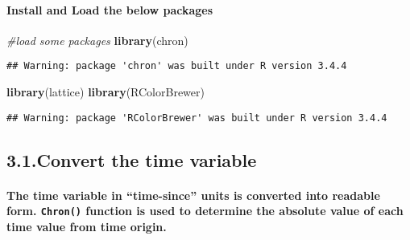 \documentclass[]{article}
\newenvironment{Shaded}{\begin{snugshade}}{\end{snugshade}}
\newcommand{\KeywordTok}[1]{\textcolor[rgb]{0.13,0.29,0.53}{\textbf{#1}}}
\newcommand{\CommentTok}[1]{\textcolor[rgb]{0.56,0.35,0.01}{\textit{#1}}}
\newcommand{\NormalTok}[1]{#1}
\let\oldparagraph\paragraph
\renewcommand{\paragraph}[1]{\oldparagraph{#1}\mbox{}}
\begin{document}
\paragraph{Install and Load the below
packages}\label{install-and-load-the-below-packages}

\begin{Shaded}
\begin{Highlighting}[]
\CommentTok{#load some packages}
\KeywordTok{library}\NormalTok{(chron)}
\end{Highlighting}
\end{Shaded}

\begin{verbatim}
## Warning: package 'chron' was built under R version 3.4.4
\end{verbatim}

\begin{Shaded}
\begin{Highlighting}[]
\KeywordTok{library}\NormalTok{(lattice)}
\KeywordTok{library}\NormalTok{(RColorBrewer)}
\end{Highlighting}
\end{Shaded}

\begin{verbatim}
## Warning: package 'RColorBrewer' was built under R version 3.4.4
\end{verbatim}

\subsection{3.1.Convert the time
variable}\label{convert-the-time-variable}

\paragraph{\texorpdfstring{The time variable in ``time-since'' units is
converted into readable form. \texttt{Chron()} function is used to
determine the absolute value of each time value from time
origin.}{The time variable in time-since units is converted into readable form. Chron() function is used to determine the absolute value of each time value from time origin.}}\label{the-time-variable-in-time-since-units-is-converted-into-readable-form.-chron-function-is-used-to-determine-the-absolute-value-of-each-time-value-from-time-origin.}
\end{document}
